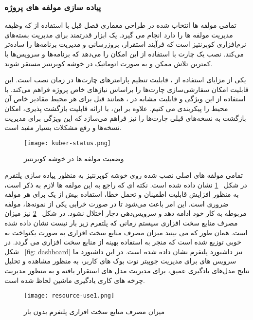 \subsubsection{پیاده سازی مولفه های پروژه}
تمامی مولفه ها انتخاب شده در طراحی معماری فصل قبل با استفاده از  که وظیفه مدیریت مولفه ها را دارد انجام می گیرد.  یک ابزار قدرتمند برای مدیریت بسته‌های نرم‌افزاری کوبرنتیز است که فرآیند استقرار، بروزرسانی و مدیریت برنامه‌ها را ساده‌تر می‌کند. نصب یک چارت با استفاده از  این امکان را می‌دهد که برنامه‌ها و سرویس‌ها با کمترین تلاش ممکن و به صورت اتوماتیک در خوشه کوبرنتیز مستقر شوند. 

یکی از مزایای استفاده از ، قابلیت تنظیم پارامترهای چارت‌ها در زمان نصب است. این قابلیت امکان سفارشی‌سازی چارت‌ها را براساس نیازهای خاص پروژه فراهم می‌کند. با استفاده از این ویژگی و قابلیت مشابه در ، همانند قبل برای هر محیط مقادیر خاص آن محیط را پیکربندی می کنیم. علاوه بر این،  با ارائه قابلیت بازگشت پذیری، امکان بازگشت به نسخه‌های قبلی چارت‌ها را نیز فراهم می‌سازد که این ویژگی برای مدیریت نسخه‌ها و رفع مشکلات بسیار مفید است. 
\begin{figure}[!t]
	\centering
	\texttt{[image: kuber-status.png]}
	\caption{وضعیت مولفه ها در خوشه کوبرنتیز}
	\label{fig: kuber status}
\end{figure}
تمامی مولفه های اصلی نصب شده روی خوشه کوبرنتیز به منظور پیاده سازی پلتفرم  در شکل
~\ref{fig: kuber status}
 نشان داده شده است. نکته ای که راجع به این مولفه ها لازم به ذکر است، به منظور افزایش قابلیت اطمینان و تحمل خطا، استفاده بیش از یک  برای هر مولفه ضروری است. این امر باعث می‌شود تا در صورت خرابی یکی از نمونه‌ها، مولفه مربوطه به کار خود ادامه دهد و سرویس‌دهی دچار اختلال نشود.
در شکل 
~\ref{fig: resource use no load}
نیز میزان مصرف منابع سخت افزاری سیستم زمانی که پلتفرم زیر بار نیست نشان داده شده است. همان طور که می بینید میزان مصرف منابع سخت افزاری به صورت یکنواخت به خوبی توزیع شده است که منجر به استفاده بهینه از منابع سخت افزاری می گردد. در شکل 
~\ref{fig: dashboard}
نیز داشبورد پلتفرم نشان داده شده است. در این داشبورد ما سرویس های  برای مدیریت جوپیتر نوت بوک های کاربر،  به منظور مشاهده و تحلیل نتایج مدل‌های یادگیری عمیق،‌  برای مدیریت مدل های استقرار یافته و‌  به منظور مدیریت چرخه های کاری یادگیری ماشین لحاظ شده است.

\begin{figure}[!t]
	\centering
	\texttt{[image: resource-use1.png]}
	\caption{میزان مصرف منابع سخت افزاری پلتفرم بدون بار}
	\label{fig: resource use no load}
\end{figure}

